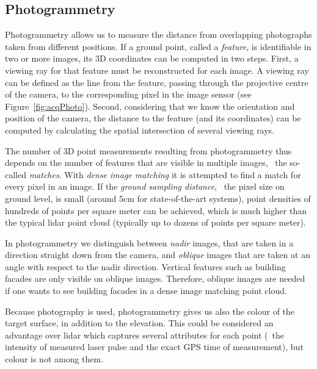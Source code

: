 

\subsection{Photogrammetry}
Photogrammetry allows us to measure the distance from overlapping photographs taken from different positions. 
If a ground point, called a \emph{feature}, is identifiable in two or more images, its 3D coordinates can be computed in two steps. 
First, a viewing ray for that feature must be reconstructed for each image. 
A viewing ray can be defined as the line from the feature, passing through the projective centre of the camera, to the corresponding pixel in the image sensor (see Figure~\ref{fig:acqPhoto}). 
Second, considering that we know the orientation and position of the camera, the distance to the feature (and its coordinates) can be computed by calculating the spatial intersection of several viewing rays.


The number of 3D point measurements resulting from photogrammetry thus depends on the number of features that are visible in multiple images, \ie\ the so-called \emph{matches}.
With \emph{dense image matching} it is attempted to find a match for every pixel in an image. 
If the \emph{ground sampling distance}, \ie\ the pixel size on ground level, is small (around 5cm for state-of-the-art systems), point densities of hundreds of points per square meter can be achieved, which is much higher than the typical lidar point cloud (typically up to dozens of points per square meter). 

In photogrammetry we distinguish between \emph{nadir} images, that are taken in a direction straight down from the camera, and \emph{oblique} images that are taken at an angle with respect to the nadir direction.
Vertical features such as building facades are only visible on oblique images.
Therefore, oblique images are needed if one wants to see building facades in a dense image matching point cloud.

Because photography is used, photogrammetry gives us also the colour of the target surface, in addition to the elevation.
This could be considered an advantage over lidar which captures several attributes for each point (\eg\ the intensity of measured laser pulse and the exact GPS time of measurement), but colour is not among them.

